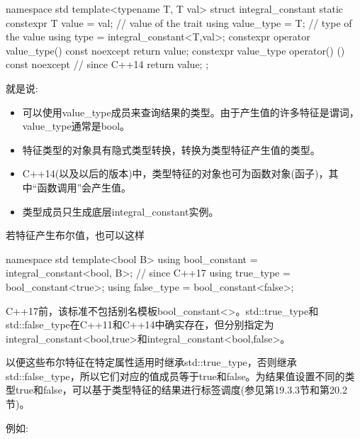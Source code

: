 \begin{cpp}
namespace std {
	template<typename T, T val>
	struct integral_constant {
		static constexpr T value = val; // value of the trait
		using value_type = T; // type of the value
		using type = integral_constant<T,val>;
		constexpr operator value_type() const noexcept {
			return value;
		}
		constexpr value_type operator() () const noexcept { // since C++14
			return value;
		}
	};
}
\end{cpp}

就是说:

\begin{itemize}
\item 
可以使用value\_type成员来查询结果的类型。由于产生值的许多特征是谓词，value\_type通常是bool。

\item 
特征类型的对象具有隐式类型转换，转换为类型特征产生值的类型。

\item 
C++14(以及以后的版本)中，类型特征的对象也可为函数对象(函子)，其中“函数调用”会产生值。

\item 
类型成员只生成底层integral\_constant实例。
\end{itemize}

若特征产生布尔值，也可以这样

\begin{cpp}
	namespace std {
		template<bool B>
		using bool_constant = integral_constant<bool, B>; // since C++17
		using true_type = bool_constant<true>;
		using false_type = bool_constant<false>;
	}
\end{cpp}

\begin{notice}
C++17前，该标准不包括别名模板bool\_constant<>。std::true\_type和std::false\_type在C++11和C++14中确实存在，但分别指定为integral\_constant<bool,true>和integral\_constant<bool,false>。
\end{notice}

以便这些布尔特征在特定属性适用时继承std::true\_type，否则继承std::false\_type，所以它们对应的值成员等于true和false。为结果值设置不同的类型true和false，可以基于类型特征的结果进行标签调度(参见第19.3.3节和第20.2节)。

例如:

